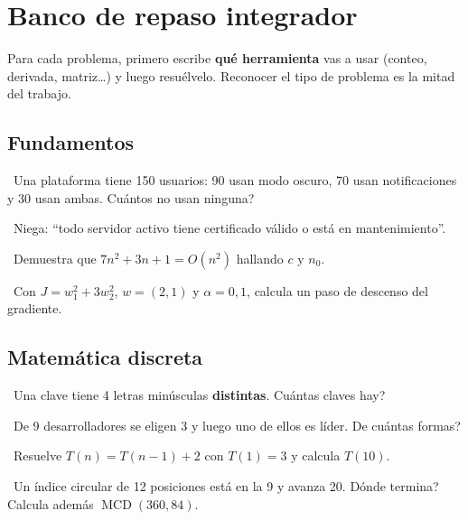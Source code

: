 \chapter{Banco de repaso integrador}

\begin{tmtip}Para cada problema, primero escribe \textbf{qu\'e herramienta} vas a usar (conteo, derivada, matriz\ldots) y luego resu\'elvelo. Reconocer el tipo de problema es la mitad del trabajo.\end{tmtip}

\section*{Fundamentos}
\begin{tmlista}
\item \tmbasico\ Una plataforma tiene 150 usuarios: 90 usan modo oscuro, 70 usan notificaciones y 30 usan ambas. \textquestiondown Cu\'antos no usan ninguna?
\item \tmmedio\ Niega: ``todo servidor activo tiene certificado v\'alido o est\'a en mantenimiento''.
\item \tmmedio\ Demuestra que $7n^2+3n+1=O(n^2)$ hallando $c$ y $n_0$.
\item \tmdificil\ Con $J=w_1^2+3w_2^2$, $w=(2, 1)$ y $\alpha=0{,}1$, calcula un paso de descenso del gradiente.
\end{tmlista}

\section*{Matem\'atica discreta}
\begin{tmlista}[start=5]
\item \tmbasico\ Una clave tiene 4 letras min\'usculas \textbf{distintas}. \textquestiondown Cu\'antas claves hay?
\item \tmmedio\ De 9 desarrolladores se eligen 3 y luego uno de ellos es l\'ider. \textquestiondown De cu\'antas formas?
\item \tmmedio\ Resuelve $T(n)=T(n-1)+2$ con $T(1)=3$ y calcula $T(10)$.
\item \tmdificil\ Un \'indice circular de 12 posiciones est\'a en la 9 y avanza 20. \textquestiondown D\'onde termina? Calcula adem\'as $\operatorname{MCD}(360, 84)$.
\end{tmlista}

